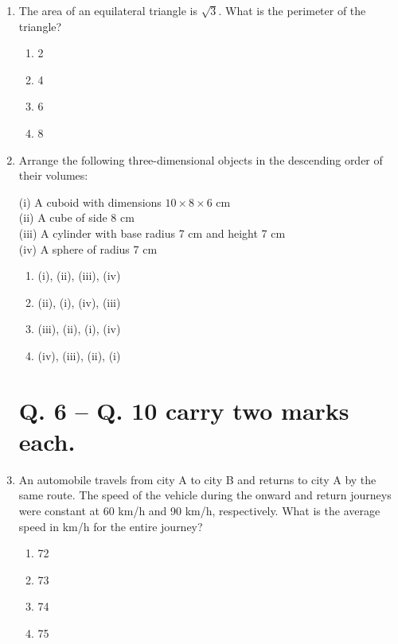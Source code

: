 \documentclass{article}
\begin{document}
\begin{enumerate}
\item The area of an equilateral triangle is $\sqrt{3}$. What is the perimeter of the triangle?  

\begin{multicols}{4}
\begin{enumerate}
\item 2
\item 4
\item 6
\item 8
\end{enumerate}
\end{multicols}

\item Arrange the following three-dimensional objects in the descending order of their volumes:  

(i) A cuboid with dimensions $10 \times 8 \times 6$ cm \\ 
(ii) A cube of side 8 cm \\
(iii) A cylinder with base radius 7 cm and height 7 cm \\ 
(iv) A sphere of radius 7 cm  

\begin{multicols}{2}
\begin{enumerate}
\item (i), (ii), (iii), (iv)
\item (ii), (i), (iv), (iii)
\item (iii), (ii), (i), (iv)
\item (iv), (iii), (ii), (i)
\end{enumerate}
\end{multicols}

\section*{Q. 6 – Q. 10 carry two marks each.}
\item An automobile travels from city A to city B and returns to city A by the same route. The speed of the vehicle during the onward and return journeys were constant at 60 km/h and 90 km/h, respectively. What is the average speed in km/h for the entire journey?  

\begin{multicols}{4}
\begin{enumerate}
\item 72
\item 73
\item 74
\item 75
\end{enumerate}
\end{multicols}



\end{enumerate}
\end{document}
